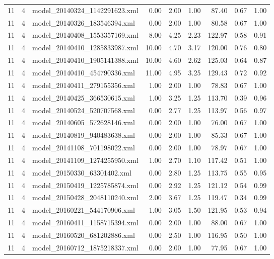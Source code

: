 \begin{table}[ht]
\begin{tabular}{rrlrrrrrr}
   11 &   4 & model\_20140324\_1142291623.xml & 0.00 & 2.00 & 1.00 & 87.40 & 0.67 & 1.00 \\ 
   11 &   4 & model\_20140326\_183546394.xml & 0.00 & 2.00 & 1.00 & 80.58 & 0.67 & 1.00 \\ 
   11 &   4 & model\_20140408\_1553357169.xml & 8.00 & 4.25 & 2.23 & 122.97 & 0.58 & 0.91 \\ 
   11 &   4 & model\_20140410\_1285833987.xml & 10.00 & 4.70 & 3.17 & 120.00 & 0.76 & 0.80 \\ 
   11 &   4 & model\_20140410\_1905141388.xml & 10.00 & 4.60 & 2.62 & 125.03 & 0.64 & 0.87 \\ 
   11 &   4 & model\_20140410\_454790336.xml & 11.00 & 4.95 & 3.25 & 129.43 & 0.72 & 0.92 \\ 
   11 &   4 & model\_20140411\_279155356.xml & 1.00 & 2.00 & 1.00 & 78.83 & 0.67 & 1.00 \\ 
   11 &   4 & model\_20140425\_366530615.xml & 1.00 & 3.25 & 1.25 & 113.70 & 0.39 & 0.96 \\ 
   11 &   4 & model\_20140524\_520707568.xml & 0.00 & 2.77 & 1.25 & 113.97 & 0.56 & 0.97 \\ 
   11 &   4 & model\_20140605\_572628146.xml & 0.00 & 2.00 & 1.00 & 76.00 & 0.67 & 1.00 \\ 
   11 &   4 & model\_20140819\_940483638.xml & 0.00 & 2.00 & 1.00 & 85.33 & 0.67 & 1.00 \\ 
   11 &   4 & model\_20141108\_701198022.xml & 0.00 & 2.00 & 1.00 & 78.97 & 0.67 & 1.00 \\ 
   11 &   4 & model\_20141109\_1274255950.xml & 1.00 & 2.70 & 1.10 & 117.42 & 0.51 & 1.00 \\ 
   11 &   4 & model\_20150330\_63301402.xml & 0.00 & 2.80 & 1.25 & 113.75 & 0.55 & 0.95 \\ 
   11 &   4 & model\_20150419\_1225785874.xml & 0.00 & 2.92 & 1.25 & 121.12 & 0.54 & 0.99 \\ 
   11 &   4 & model\_20150428\_2048110240.xml & 2.00 & 3.67 & 1.25 & 119.47 & 0.34 & 0.99 \\ 
   11 &   4 & model\_20160221\_544170906.xml & 1.00 & 3.05 & 1.50 & 121.95 & 0.53 & 0.94 \\ 
   11 &   4 & model\_20160411\_1158715394.xml & 0.00 & 2.00 & 1.00 & 88.00 & 0.67 & 1.00 \\ 
   11 &   4 & model\_20160520\_681202886.xml & 0.00 & 2.50 & 1.00 & 116.95 & 0.50 & 1.00 \\ 
   11 &   4 & model\_20160712\_1875218337.xml & 0.00 & 2.00 & 1.00 & 77.95 & 0.67 & 1.00 \\ 

\end{tabular}
\end{table}
